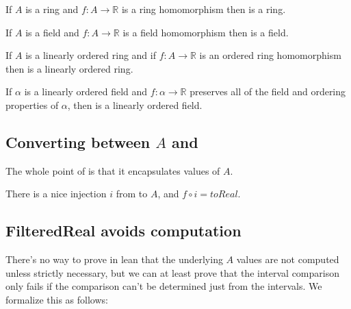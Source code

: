 \begin{lemma}
  \label{thm:filteredRing}
  \leanok
  If $A$ is a ring and $f : A → ℝ$ is a ring homomorphism then 
  is a ring.
\end{lemma}

\begin{lemma}
  \label{thm:filteredField}
  \leanok
  If $A$ is a field and $f : A → ℝ$ is a field homomorphism then 
  is a field.
\end{lemma}

\begin{lemma}
  \label{thm:filteredOrderedRing}
  If $A$ is a linearly ordered ring and if $f : A → ℝ$ is an ordered ring homomorphism then
   is a linearly ordered ring.
\end{lemma}

\begin{theorem}
  \label{thm:filteredOrderedField}
  If $α$ is a linearly ordered field and $f : α → ℝ$ preserves all of the field
  and ordering properties of $α$, then  is a linearly
  ordered field.
\end{theorem}

\subsection{Converting between $A$ and }

The whole point of  is that it encapsulates values of
$A$.

\begin{definition}
  \label{def:filteredEquivalent}
  \notready
  There is a nice injection $i$ from  to
  $A$, and $f \circ i = toReal$.
\end{definition}

\subsection{FilteredReal avoids computation}

There's no way to prove in lean that the underlying $A$ values are not computed
unless strictly necessary, but we can at least prove that the interval
comparison only fails if the comparison can't be determined just from the
intervals. We formalize this as follows:

